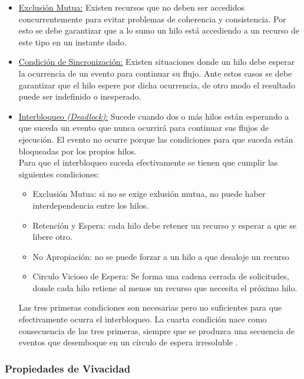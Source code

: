 \begin{itemize}
    \item \underline{Exclusión Mutua:} Existen recursos que no deben ser
    accedidos concurrentemente para evitar problemas de coherencia y
    consistencia. Por esto se debe garantizar que a lo sumo un hilo está
    accediendo a un recurso de este tipo en un instante dado.
    \item \underline{Condición de Sincronización:} Existen situaciones
    donde un hilo debe esperar la ocurrencia de un evento para continuar su
    flujo. Ante estos casos se debe garantizar que el hilo espere por dicha
    ocurrencia, de otro modo el resultado puede ser indefinido o inesperado.
    \item \underline{Interbloqueo \textit{(Deadlock)}:} Sucede cuando dos o más
    hilos están esperando a que suceda un evento que nunca ocurrirá para
    continuar sus flujos de ejecución. El evento no ocurre porque las
    condiciones para que suceda están bloqueadas por los propios hilos.\\
    Para que el interbloqueo suceda efectivamente se tienen que cumplir las
    siguientes condiciones:
    \begin{itemize} 
        \item Exclusión Mutua: si no se exige exlusión mutua, no puede haber
        interdependencia entre los hilos.
        \item Retención y Espera: cada hilo debe retener un recurso y esperar
        a que se libere otro.
        \item No Apropiación: no se puede forzar a un hilo a que desaloje un
        recurso
        \item Circulo Vicioso de Espera: Se forma una cadena cerrada de
        solicitudes, donde cada hilo retiene al menos un recurso que necesita el
        próximo hilo.
    \end{itemize}
    Las tres primeras condiciones son necesarias pero no suficientes para que
    efectivamente ocurra el interbloqueo. La cuarta condición nace como
    consecuencia de las tres primeras, siempre que se produzca una secuencia de
    eventos que desemboque en un círculo de espera irresoluble
    \cite{SistOpStallings}.
\end{itemize}

\subsubsection*{Propiedades de Vivacidad}

